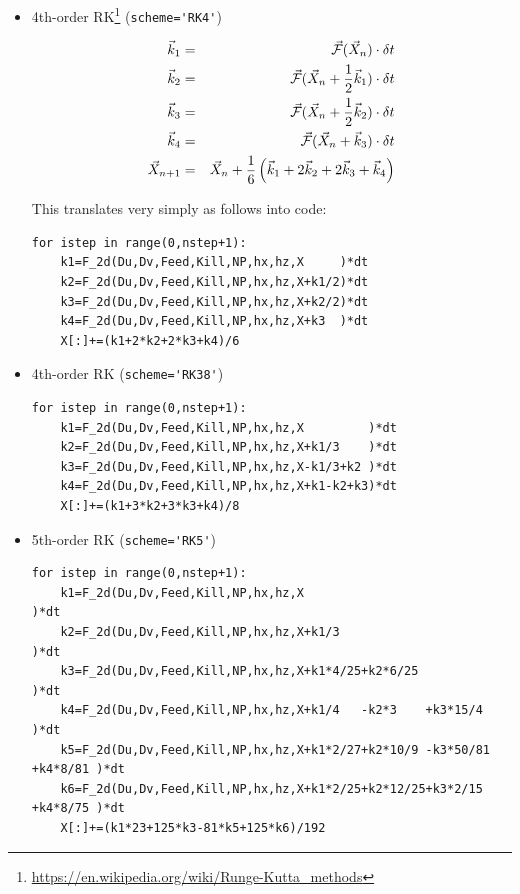 \begin{itemize}
\item 4th-order RK\footnote{\url{https://en.wikipedia.org/wiki/Runge-Kutta_methods}}
(\lstinline{scheme='RK4'})

\begin{eqnarray}
\vec{k}_1 &=& \vec{\cal F}(\vec{X}_n) \cdot \delta t\nonumber\\
\vec{k}_2 &=& \vec{\cal F}(\vec{X}_n+ \frac12\vec{k}_1) \cdot \delta t \nonumber\\
\vec{k}_3 &=& \vec{\cal F}(\vec{X}_n+ \frac12\vec{k}_2) \cdot \delta t \nonumber\\
\vec{k}_4 &=& \vec{\cal F}(\vec{X}_n+ \vec{k}_3)    \cdot \delta t \nonumber \\
\vec{X}_{n+1} &=& \vec{X}_n + \frac{1}{6}\left(\vec{k}_1 + 2\vec{k}_2 + 2\vec{k}_3 + \vec{k}_4\right)
\end{eqnarray}

This translates very simply as follows into code:
\begin{lstlisting}
for istep in range(0,nstep+1):
    k1=F_2d(Du,Dv,Feed,Kill,NP,hx,hz,X     )*dt
    k2=F_2d(Du,Dv,Feed,Kill,NP,hx,hz,X+k1/2)*dt
    k3=F_2d(Du,Dv,Feed,Kill,NP,hx,hz,X+k2/2)*dt
    k4=F_2d(Du,Dv,Feed,Kill,NP,hx,hz,X+k3  )*dt
    X[:]+=(k1+2*k2+2*k3+k4)/6
\end{lstlisting}


\item 4th-order RK (\lstinline{scheme='RK38'})

\begin{lstlisting}
for istep in range(0,nstep+1):
    k1=F_2d(Du,Dv,Feed,Kill,NP,hx,hz,X         )*dt
    k2=F_2d(Du,Dv,Feed,Kill,NP,hx,hz,X+k1/3    )*dt
    k3=F_2d(Du,Dv,Feed,Kill,NP,hx,hz,X-k1/3+k2 )*dt
    k4=F_2d(Du,Dv,Feed,Kill,NP,hx,hz,X+k1-k2+k3)*dt
    X[:]+=(k1+3*k2+3*k3+k4)/8
\end{lstlisting}

\item 5th-order RK (\lstinline{scheme='RK5'})

\begin{lstlisting}
for istep in range(0,nstep+1):
    k1=F_2d(Du,Dv,Feed,Kill,NP,hx,hz,X                                    )*dt
    k2=F_2d(Du,Dv,Feed,Kill,NP,hx,hz,X+k1/3                               )*dt
    k3=F_2d(Du,Dv,Feed,Kill,NP,hx,hz,X+k1*4/25+k2*6/25                    )*dt
    k4=F_2d(Du,Dv,Feed,Kill,NP,hx,hz,X+k1/4   -k2*3    +k3*15/4           )*dt
    k5=F_2d(Du,Dv,Feed,Kill,NP,hx,hz,X+k1*2/27+k2*10/9 -k3*50/81 +k4*8/81 )*dt
    k6=F_2d(Du,Dv,Feed,Kill,NP,hx,hz,X+k1*2/25+k2*12/25+k3*2/15  +k4*8/75 )*dt
    X[:]+=(k1*23+125*k3-81*k5+125*k6)/192
\end{lstlisting}


\end{itemize}
